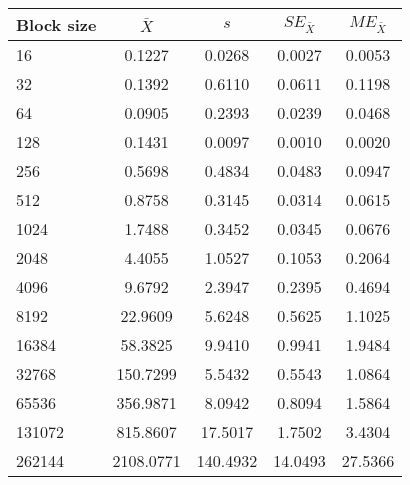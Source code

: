 \begin{tabular}{lcccc}\toprule
{\small Block size} & $\bar{X}$ & $s$ & $SE_{\bar{X}}$ & $ME_{\bar{X}}$ \\\midrule
16 & 0.1227 & 0.0268 & 0.0027 & 0.0053\\
32 & 0.1392 & 0.6110 & 0.0611 & 0.1198\\
64 & 0.0905 & 0.2393 & 0.0239 & 0.0468\\
128 & 0.1431 & 0.0097 & 0.0010 & 0.0020\\
256 & 0.5698 & 0.4834 & 0.0483 & 0.0947\\
512 & 0.8758 & 0.3145 & 0.0314 & 0.0615\\
1024 & 1.7488 & 0.3452 & 0.0345 & 0.0676\\
2048 & 4.4055 & 1.0527 & 0.1053 & 0.2064\\
4096 & 9.6792 & 2.3947 & 0.2395 & 0.4694\\
8192 & 22.9609 & 5.6248 & 0.5625 & 1.1025\\
16384 & 58.3825 & 9.9410 & 0.9941 & 1.9484\\
32768 & 150.7299 & 5.5432 & 0.5543 & 1.0864\\
65536 & 356.9871 & 8.0942 & 0.8094 & 1.5864\\
131072 & 815.8607 & 17.5017 & 1.7502 & 3.4304\\
262144 & 2108.0771 & 140.4932 & 14.0493 & 27.5366\\
\bottomrule
\end{tabular}
